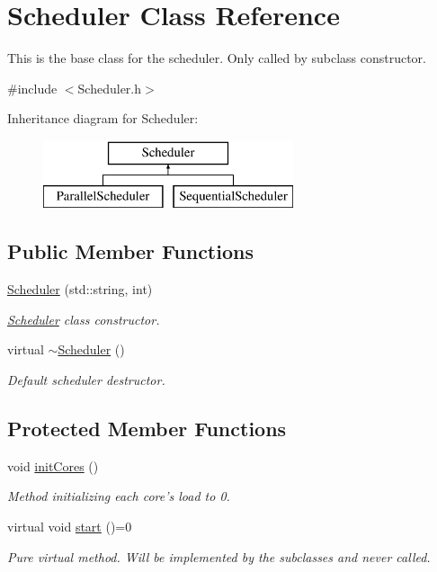 \hypertarget{classScheduler}{\section{Scheduler Class Reference}
\label{classScheduler}
}


This is the base class for the scheduler. Only called by subclass constructor.  




{\ttfamily \#include $<$Scheduler.\-h$>$}

Inheritance diagram for Scheduler\-:\begin{figure}[H]
\begin{center}
\leavevmode
\includegraphics[height=2.000000cm]{classScheduler}
\end{center}
\end{figure}
\subsection*{Public Member Functions}
\begin{DoxyCompactItemize}
\item 
\hyperlink{classScheduler_abff3c6b4c4c7823bdf4b61f2116e1c13}{Scheduler} (std\-::string, int)
\begin{DoxyCompactList}\small\item\em \hyperlink{classScheduler}{Scheduler} class constructor. \end{DoxyCompactList}\item 
virtual \hyperlink{classScheduler_afc8187779b46f64039d3ffa58f0dbe51}{$\sim$\-Scheduler} ()
\begin{DoxyCompactList}\small\item\em Default scheduler destructor. \end{DoxyCompactList}\end{DoxyCompactItemize}
\subsection*{Protected Member Functions}
\begin{DoxyCompactItemize}
\item 
void \hyperlink{classScheduler_a1befb7a203a0e28730e5aa6489bc2a44}{init\-Cores} ()
\begin{DoxyCompactList}\small\item\em Method initializing each core's load to 0. \end{DoxyCompactList}\item 
virtual void \hyperlink{classScheduler_aaa8fed2f8fab3a5c0e5d1d462915e415}{start} ()=0
\begin{DoxyCompactList}\small\item\em Pure virtual method. Will be implemented by the subclasses and never called. \end{DoxyCompactList}\end{DoxyCompactItemize}
